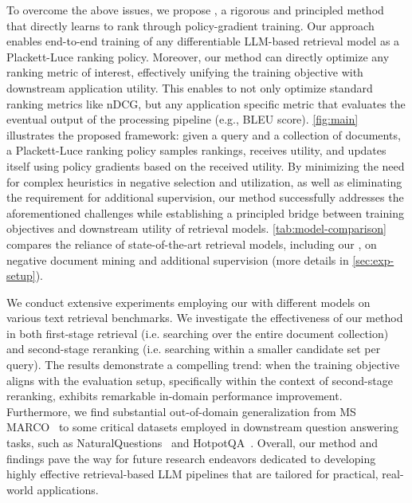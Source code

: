 \documentclass{article}
\begin{document}
To overcome the above issues, we propose \alg{}, a rigorous and principled method that directly learns to rank through policy-gradient training. Our approach enables end-to-end training of any differentiable LLM-based retrieval model as a Plackett-Luce ranking policy. Moreover, our method can directly optimize any ranking metric of interest, effectively unifying the training objective with downstream application utility. This enables \alg{} to not only optimize standard ranking metrics like nDCG, but any application specific metric that evaluates the eventual output of the processing pipeline (e.g., BLEU score). \autoref{fig:main} illustrates the proposed \alg{} framework: given a query and a collection of documents, a Plackett-Luce ranking policy samples rankings, receives utility, and updates itself using policy gradients based on the received utility. By minimizing the need for complex heuristics in negative selection and utilization, as well as eliminating the requirement for additional supervision, our method successfully addresses the aforementioned challenges while establishing a principled bridge between training objectives and downstream utility of retrieval models.
\autoref{tab:model-comparison} compares the reliance of state-of-the-art retrieval models, including our \alg{}, on negative document mining and additional supervision (more details in \autoref{sec:exp-setup}).

We conduct extensive experiments employing our \alg{} with different models on various text retrieval benchmarks. We investigate the effectiveness of our method in both first-stage retrieval (i.e. searching over the entire document collection) and second-stage reranking (i.e. searching within a smaller candidate set per query). The results demonstrate a compelling trend: when the training objective aligns with the evaluation setup, specifically within the context of second-stage reranking, \alg{} exhibits remarkable in-domain performance improvement.
Furthermore, we find substantial out-of-domain generalization from MS MARCO~\citep{Campos2016MSMA} to some critical datasets employed in downstream question answering tasks, such as NaturalQuestions~\citep[NQ;][]{Kwiatkowski2019NaturalQA} and HotpotQA~\citep{Yang2018HotpotQAAD}. 
Overall, our method and findings pave the way for future research endeavors dedicated to developing highly effective retrieval-based LLM pipelines that are tailored for practical, real-world applications. 
\end{document}
